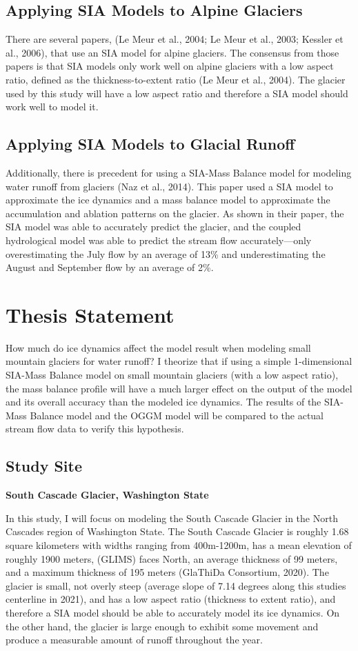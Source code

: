 \documentclass{article}
\begin{document}
\subsection{Applying SIA Models to Alpine Glaciers}
    There are several papers, (Le Meur et al., 2004; Le Meur et al., 2003; Kessler et al., 2006), that use an SIA model for alpine glaciers. The consensus 
from those papers is that SIA models only work well on alpine glaciers with a low aspect ratio, defined as the thickness-to-extent ratio 
(Le Meur et al., 2004). The glacier used by this study will have a low aspect ratio and therefore a SIA model should work well to model it.
\subsection{Applying SIA Models to Glacial Runoff}
    Additionally, there is precedent for using a SIA-Mass Balance model for modeling water runoff from glaciers (Naz et al., 2014). This paper used 
a SIA model to approximate the ice dynamics and a mass balance model to approximate the accumulation and ablation patterns on the glacier. 
As shown in their paper, the SIA model was able to accurately predict the glacier, and the coupled hydrological model was able to predict 
the stream flow accurately---only overestimating the July flow by an average of 13\% and underestimating the August and September flow by an 
average of 2\%.

\section{Thesis Statement}
How much do ice dynamics affect the model result when modeling small mountain glaciers for water runoff? I theorize that if using a simple 
1-dimensional SIA-Mass Balance model on small mountain glaciers (with a low aspect ratio), the mass balance profile will have a 
much larger effect on the output of the model and its overall accuracy than the modeled ice dynamics. The results of the SIA-Mass Balance 
model and the OGGM model will be compared to the actual stream flow data to verify this hypothesis.
\subsection{Study Site}
\textbf{\large South Cascade Glacier, Washington State}

In this study, I will focus on modeling the South Cascade Glacier in the North Cascades region of Washington State. The South Cascade Glacier is 
roughly 1.68 square kilometers with widths ranging from 400m-1200m, has a mean elevation of roughly 1900 meters, (GLIMS) faces North, an average thickness of 99 meters, and a 
maximum thickness of 195 meters (GlaThiDa Consortium, 2020). The glacier is small, not overly steep (average slope of 7.14 degrees along this studies 
centerline in 2021), and has a low aspect ratio (thickness to extent ratio), and therefore a
SIA model should be able to accurately model its ice dynamics. On the other hand, the glacier is large enough to exhibit some movement 
and produce a measurable amount of runoff throughout the year.
\end{document}
